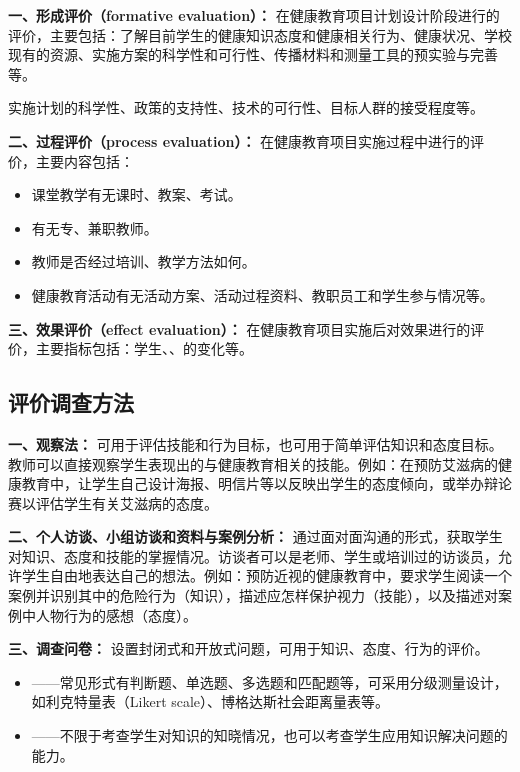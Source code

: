 \begin{keybox}
\textbf{一、形成评价（formative evaluation）：}
在健康教育项目计划设计阶段进行的评价，主要包括：了解目前学生的健康知识态度和健康相关行为、健康状况、学校现有的资源、实施方案的科学性和可行性、传播材料和测量工具的预实验与完善等。

实施计划的科学性、政策的支持性、技术的可行性、目标人群的接受程度等。

\textbf{二、过程评价（process evaluation）：}
在健康教育项目实施过程中进行的评价，主要内容包括：
\begin{itemize}[leftmargin=*]
    \item 课堂教学有无课时、教案、考试。
    \item 有无专、兼职教师。
    \item 教师是否经过培训、教学方法如何。
    \item 健康教育活动有无活动方案、活动过程资料、教职员工和学生参与情况等。
\end{itemize}

\textbf{三、效果评价（effect evaluation）：}
在健康教育项目实施后对效果进行的评价，主要指标包括：学生、、的变化等。
\end{keybox}

\subsection{评价调查方法}

\begin{keybox}
\textbf{一、观察法：}
可用于评估技能和行为目标，也可用于简单评估知识和态度目标。教师可以直接观察学生表现出的与健康教育相关的技能。例如：在预防艾滋病的健康教育中，让学生自己设计海报、明信片等以反映出学生的态度倾向，或举办辩论赛以评估学生有关艾滋病的态度。

\textbf{二、个人访谈、小组访谈和资料与案例分析：}
通过面对面沟通的形式，获取学生对知识、态度和技能的掌握情况。访谈者可以是老师、学生或培训过的访谈员，允许学生自由地表达自己的想法。例如：预防近视的健康教育中，要求学生阅读一个案例并识别其中的危险行为（知识），描述应怎样保护视力（技能），以及描述对案例中人物行为的感想（态度）。

\textbf{三、调查问卷：}
设置封闭式和开放式问题，可用于知识、态度、行为的评价。
\begin{itemize}[leftmargin=*]
    \item {}——常见形式有判断题、单选题、多选题和匹配题等，可采用分级测量设计，如利克特量表（Likert scale）、博格达斯社会距离量表等。
    \item {}——不限于考查学生对知识的知晓情况，也可以考查学生应用知识解决问题的能力。
\end{itemize}
\end{keybox}


